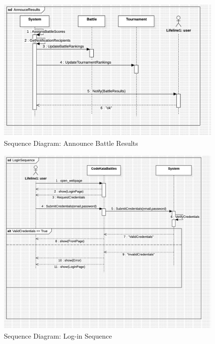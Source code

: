 \newpage
\begin{figure}[Htbp!]
    \centering
    \includegraphics[width=\textwidth]{Graphics/Sequence Diagrams/AnnouceResults.png}
    \caption{Sequence Diagram: Announce Battle Results}
    \label{fig:Announcement}
\end{figure}



\begin{figure}[Htbp!]
    \centering
    \includegraphics[width=\textwidth]{Graphics/Sequence Diagrams/LoginSequence.png}
    \caption{Sequence Diagram: Log-in Sequence}
    \label{fig:login}
\end{figure}

\newpage